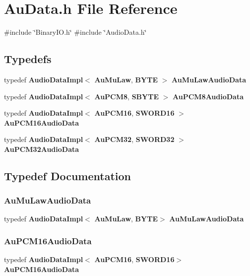 \section{Au\+Data.\+h File Reference}
\label{AuData_8h}
{\ttfamily \#include \char`\"{}Binary\+I\+O.\+h\char`\"{}}\newline
{\ttfamily \#include \char`\"{}Audio\+Data.\+h\char`\"{}}\newline
\subsection*{Typedefs}
\begin{DoxyCompactItemize}
\item 
typedef \textbf{ Audio\+Data\+Impl}$<$ \textbf{ Au\+Mu\+Law}, \textbf{ B\+Y\+TE} $>$ \textbf{ Au\+Mu\+Law\+Audio\+Data}
\item 
typedef \textbf{ Audio\+Data\+Impl}$<$ \textbf{ Au\+P\+C\+M8}, \textbf{ S\+B\+Y\+TE} $>$ \textbf{ Au\+P\+C\+M8\+Audio\+Data}
\item 
typedef \textbf{ Audio\+Data\+Impl}$<$ \textbf{ Au\+P\+C\+M16}, \textbf{ S\+W\+O\+R\+D16} $>$ \textbf{ Au\+P\+C\+M16\+Audio\+Data}
\item 
typedef \textbf{ Audio\+Data\+Impl}$<$ \textbf{ Au\+P\+C\+M32}, \textbf{ S\+W\+O\+R\+D32} $>$ \textbf{ Au\+P\+C\+M32\+Audio\+Data}
\end{DoxyCompactItemize}


\subsection{Typedef Documentation}
\mbox{\label{AuData_8h_ae76ad10c3385adcec71e863420244e0a}} 
\subsubsection{Au\+Mu\+Law\+Audio\+Data}
{\footnotesize\ttfamily typedef \textbf{ Audio\+Data\+Impl}$<$\textbf{ Au\+Mu\+Law},\textbf{ B\+Y\+TE}$>$ \textbf{ Au\+Mu\+Law\+Audio\+Data}}

\mbox{\label{AuData_8h_ad3344f65dcc529629052c1ef568dc1d7}} 
\subsubsection{Au\+P\+C\+M16\+Audio\+Data}
{\footnotesize\ttfamily typedef \textbf{ Audio\+Data\+Impl}$<$\textbf{ Au\+P\+C\+M16},\textbf{ S\+W\+O\+R\+D16}$>$ \textbf{ Au\+P\+C\+M16\+Audio\+Data}}

